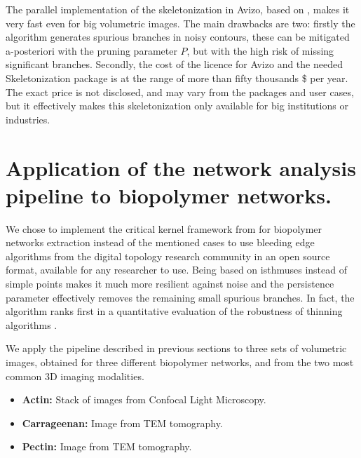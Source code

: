 
The parallel implementation of the skeletonization in Avizo, based on \cite{fouard_skeletonization_2004}, makes it very fast even for big volumetric images.
The main drawbacks are two: firstly the algorithm generates spurious branches in noisy contours,
these can be mitigated a-posteriori with the pruning parameter $P$, but with the high risk of missing significant branches.
Secondly, the cost of the licence for Avizo and the needed Skeletonization package is at the range of more than fifty thousands \$ per year. The exact price is not disclosed, and may vary from the packages and user cases, but it effectively makes this skeletonization only available for big institutions or industries.

\section{Application of the network analysis pipeline to biopolymer networks.}%
\label{sec:sg_results}


We chose to implement the critical kernel framework from \citep{bertrand_powerful_2014} for biopolymer networks extraction instead of the mentioned cases to use bleeding edge algorithms from the digital topology research community in an open source format, available for any researcher to use. Being based on isthmuses instead of simple points makes it much more resilient against noise and the persistence parameter effectively removes the remaining small spurious branches. In fact, the algorithm ranks first in a quantitative evaluation of the robustness of thinning algorithms \cite{bertrand_powerful_2014, couprie_3d_2015}.

We apply the pipeline described in previous sections to three sets of volumetric images, obtained for three different biopolymer networks, and from the two most common 3D imaging modalities.

\begin{itemize}[topsep=0pt]
  \item \textbf{Actin: } Stack of images from Confocal Light Microscopy.
  \item \textbf{Carrageenan: } Image from \gls{TEM} tomography.
  \item \textbf{Pectin: } Image from \gls{TEM} tomography.
\end{itemize}

